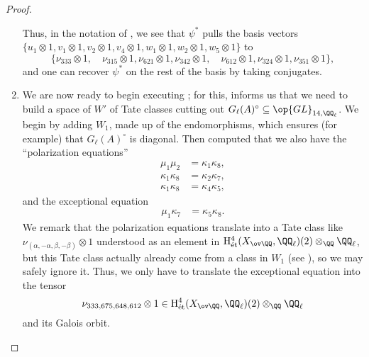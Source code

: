 \documentclass[../thesis.tex]{subfiles}
\begin{document}
\begin{proof}
\begin{enumerate}
		Thus, in the notation of , we see that $\psi^*$ pulls the basis vectors $\{u_1\otimes1,v_1\otimes1,v_2\otimes1,v_4\otimes1,w_1\otimes1,w_2\otimes1,w_5\otimes1\}$ to
		\[\{\nu_{333}\otimes1,\quad\nu_{315}\otimes1,\nu_{621}\otimes1,\nu_{342}\otimes1,\quad\nu_{612}\otimes1,\nu_{324}\otimes1,\nu_{351}\otimes1\},\]
		and one can recover $\psi^*$ on the rest of the basis by taking conjugates.

		\item We are now ready to begin executing ; for this,  informs us that we need to build a space of $W'$ of Tate classes cutting out $G_\ell(A)^\circ\subseteq\op{GL}_{14,\QQ_\ell}$. We begin by adding $W_1$, made up of the endomorphisms, which ensures (for example) that $G_\ell(A)^\circ$ is diagonal. Then  computed that we also have the ``polarization equations''
		\begin{align*}
			\mu_1\mu_2 &= \kappa_1\kappa_8, \\
			\kappa_1\kappa_8 &= \kappa_2\kappa_7, \\
			\kappa_1\kappa_8 &= \kappa_4\kappa_5,
		\end{align*}
		and the exceptional equation
		\begin{align*}
			\mu_1\kappa_7 &= \kappa_5\kappa_8.
		\end{align*}
		We remark that the polarization equations translate into a Tate class like $\nu_{(\alpha,-\alpha,\beta,-\beta)}\otimes1$ understood as an element in $\mathrm H^4_{\mathrm{\acute et}}(X_{\ov\QQ},\QQ_\ell)(2)\otimes_\QQ\QQ_\ell$, but this Tate class actually already come from a class in $W_1$ (see ), so we may safely ignore it. Thus, we only have to translate the exceptional equation into the tensor
		\[\nu_{333,675,648,612}\otimes1\in\mathrm H^4_{\mathrm{\acute et}}(X_{\ov\QQ},\QQ_\ell)(2)\otimes_\QQ\QQ_\ell\]
		and its Galois orbit.


\end{enumerate}
\end{proof}
\end{document}
